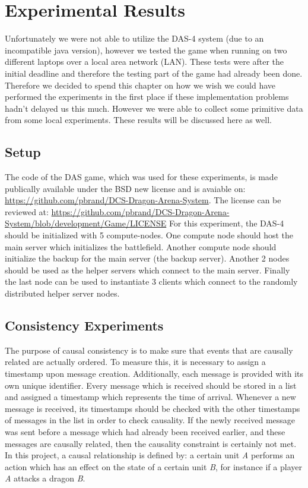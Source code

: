 \section{Experimental Results}
Unfortunately we were not able to utilize the DAS-4 system (due to an incompatible java version), however we tested the game when running on two different laptops over a local area network (LAN). These tests were after the initial deadline and therefore the testing part of the game had already been done. Therefore we decided to spend this chapter on how we wish we could have performed the experiments in the first place if these implementation problems hadn't delayed us this much. However we were able to collect some primitive data from some local experiments. These results will be discussed here as well.

\subsection{Setup}
The code of the DAS game, which was used for these experiments, is made publically available under the BSD new license and is avaiable on: \url{https://github.com/pbrand/DCS-Dragon-Arena-System}. 
The license can be reviewed at: \url{https://github.com/pbrand/DCS-Dragon-Arena-System/blob/development/Game/LICENSE}
For this experiment, the DAS-4 should be initialized with 5 compute-nodes. 
One compute node should host the main server which initializes the battlefield. 
Another compute node should initialize the backup for the main server (the backup server). 
Another 2 nodes should be used as the helper servers which connect to the main server. 
Finally the last node can be used to instantiate 3 clients which connect to the randomly distributed helper server nodes.

\subsection{Consistency Experiments}
The purpose of causal consistency is to make sure that events that are causally related are actually ordered. 
To measure this, it is necessary to assign a timestamp upon message creation. 
Additionally, each message is provided with its own unique identifier. 
Every message which is received should be stored in a list and assigned a timestamp which represents the time of arrival.
Whenever a new message is received, its timestamps should be checked with the other timestamps of messages in the list in order to check causality. If the newly received message was sent before a message which had already been received earlier, and these messages are causally related, then the causality constraint is certainly not met.
In this project, a causal relationship is defined by: a certain unit \emph{A} performs an action which has an effect on the state of a certain unit \emph{B}, for instance if a player \emph{A} attacks a dragon \emph{B}.

